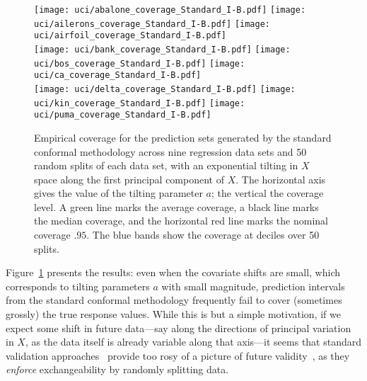 \begin{figure}[h!]
  \centering
  \texttt{[image: uci/abalone\_coverage\_Standard\_I-B.pdf]}
  \hfill
  \texttt{[image: uci/ailerons\_coverage\_Standard\_I-B.pdf]}
  \hfill
  \texttt{[image: uci/airfoil\_coverage\_Standard\_I-B.pdf]}
  \\
  \texttt{[image: uci/bank\_coverage\_Standard\_I-B.pdf]}
  \hfill
  \texttt{[image: uci/bos\_coverage\_Standard\_I-B.pdf]}
  \hfill
  \texttt{[image: uci/ca\_coverage\_Standard\_I-B.pdf]}
  \\
  \texttt{[image: uci/delta\_coverage\_Standard\_I-B.pdf]}
  \hfill
  \texttt{[image: uci/kin\_coverage\_Standard\_I-B.pdf]}
  \hfill
  \texttt{[image: uci/puma\_coverage\_Standard\_I-B.pdf]}  
  \caption{Empirical coverage for the prediction sets generated by the standard
    conformal methodology across nine regression data sets and 50
    random splits of each data set, with an exponential tilting in $X$ space
    along the first principal component of $X$. The horizontal axis gives the
    value of the tilting parameter $a$; the vertical the coverage level. A green
    line marks the average coverage, a black line marks the median coverage, and
    the horizontal red line marks the nominal coverage $.95$. The blue bands
    show the coverage at deciles over 50 splits.}
  \label{fig:cvgs_only_std}
\end{figure}

Figure~\ref{fig:cvgs_only_std} presents the results: even when the covariate
shifts are small, which corresponds to tilting parameters $a$ with small
magnitude, prediction intervals from the standard conformal methodology
frequently fail to cover (sometimes grossly) the true response values. While
this is but a simple motivation, if we expect some
shift in future data---say along the directions of principal variation in
$X$, as the data itself is already variable along that axis---it seems that
standard validation approaches~\cite{HastieTiFr09} provide too rosy
of a picture of future validity~\cite{RechtRoScSh19}, as they \emph{enforce}
exchangeability by randomly splitting data.
